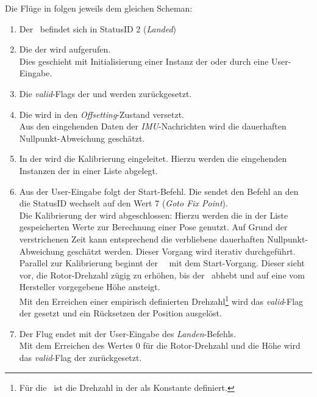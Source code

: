 \FloatBarrier
{}
Die Flüge in  folgen jeweils dem gleichen Scheman:
\begin{enumerate}
\item Der \Quad\ befindet sich in StatusID 2 (\textit{Landed})
\item Die  der  wird aufgerufen.\\
Dies geschieht mit Initialisierung einer Instanz der  oder durch eine User-Eingabe.
\item Die \textit{valid}-Flags der  und  werden zurückgesetzt.
\item Die  wird in den \textit{Offsetting}-Zustand versetzt.\\
Aus den eingehenden Daten der \textit{IMU}-Nachrichten wird die dauerhaften Nullpunkt-Abweichung geschätzt.
\item In der  wird die Kalibrierung eingeleitet. Hierzu werden die eingehenden Instanzen der  in einer Liste abgelegt.
\item Aus der User-Eingabe folgt der Start-Befehl.
Die  sendet den Befehl an den \Quad\, die StatusID wechselt auf den Wert 7 (\textit{Goto Fix Point}).\\
Die Kalibrierung der  wird abgeschlossen: Hierzu werden die in der Liste gespeicherten Werte zur Berechnung einer Pose genutzt. Auf Grund der verstrichenen Zeit kann entsprechend  die verbliebene dauerhaften Nullpunkt-Abweichung geschätzt werden. Dieser Vorgang wird iterativ durchgeführt.\\
Parallel zur Kalibrierung beginnt der \Quad\ \Ar\ mit dem Start-Vorgang. Dieser sieht vor, die Rotor-Drehzahl zügig zu erhöhen, bis der \Quad\ abhebt und auf eine vom Hersteller vorgegebene Höhe ansteigt.\\
Mit den Erreichen einer empirisch definierten Drehzahl\footnote{Für die \Ar\ ist die Drehzahl in der  als Konstante  definiert.} wird das \textit{valid}-Flag der  gesetzt und ein Rücksetzen der Position ausgelöst.
\item Der Flug endet mit der User-Eingabe des \textit{Landen}-Befehls.\\
Mit dem Erreichen des Wertes 0 für die Rotor-Drehzahl und die Höhe wird das \textit{valid}-Flag der  zurückgesetzt.
\end{enumerate}


